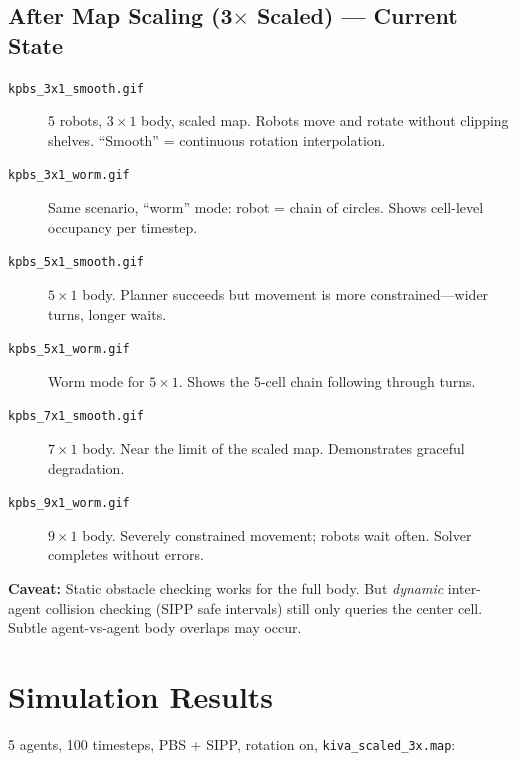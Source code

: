 \documentclass[12pt, a4paper]{article}
\begin{document}
\subsection{After Map Scaling (3$\times$ Scaled) --- Current State}

\begin{description}
    \item[\texttt{kpbs\_3x1\_smooth.gif}] 5 robots, $3\times1$ body, scaled map. Robots move and rotate without clipping shelves. ``Smooth'' = continuous rotation interpolation.

    \item[\texttt{kpbs\_3x1\_worm.gif}] Same scenario, ``worm'' mode: robot = chain of circles. Shows cell-level occupancy per timestep.

    \item[\texttt{kpbs\_5x1\_smooth.gif}] $5\times1$ body. Planner succeeds but movement is more constrained---wider turns, longer waits.

    \item[\texttt{kpbs\_5x1\_worm.gif}] Worm mode for $5\times1$. Shows the 5-cell chain following through turns.

    \item[\texttt{kpbs\_7x1\_smooth.gif}] $7\times1$ body. Near the limit of the scaled map. Demonstrates graceful degradation.

    \item[\texttt{kpbs\_9x1\_worm.gif}] $9\times1$ body. Severely constrained movement; robots wait often. Solver completes without errors.
\end{description}

\textbf{Caveat:} Static obstacle checking works for the full body. But \emph{dynamic} inter-agent collision checking (SIPP safe intervals) still only queries the center cell. Subtle agent-vs-agent body overlaps may occur.

\section{Simulation Results}

5 agents, 100 timesteps, PBS + SIPP, rotation on, \texttt{kiva\_scaled\_3x.map}:
\end{document}
